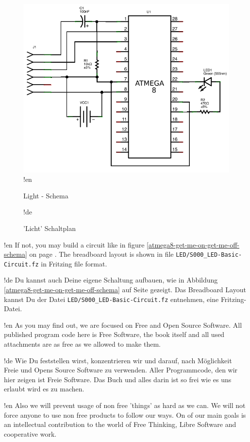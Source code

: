 \documentclass[twoside,12pt,authoryear,openright]{book}
\begin{document}
\begin{figure}[htbp]
  \centering
  \includegraphics[width=120mm]{LED/S000_let-there-be-light_Circuit_schema.png}
!en  \caption{Light - Schema}
!de  \caption{'Licht' Schaltplan}
  \label{atmega8-let-there-be-light-schema}
\end{figure}

!en If not, you may build a circuit like in figure \ref{atmega8-get-me-on-get-me-off-schema} on page \pageref{atmega8-get-me-on-get-me-off-schema}. The breadboard layout is shown in file \texttt{LED/S000\_LED-Basic-Circuit.fz} in Fritzing file format.

!de Du kannst auch Deine eigene Schaltung aufbauen, wie in Abbildung \ref{atmega8-get-me-on-get-me-off-schema} auf Seite \pageref{atmega8-get-me-on-get-me-off-schema} gezeigt. Das Breadboard Layout kannst Du der Datei \texttt{LED/S000\_LED-Basic-Circuit.fz} entnehmen, eine Fritzing-Datei.



!en As you may find out, we are focused on Free and Open Source Software. All published program code here is Free Software, the book itself and all used attachments are as free as we allowed to make them.

!de Wie Du feststellen wirst, konzentrieren wir und darauf, nach Möglichkeit Freie und Opens Source Software zu verwenden. Aller Programmcode, den wir hier zeigen ist Freie Software. Das Buch und alles darin ist so frei wie es uns erlaubt wird es zu machen.



!en Also we will prevent usage of non free 'things' as hard as we can. We will not force anyone to use non free products to follow our ways. On of our main goals is an intellectual contribution to the world of Free Thinking, Libre Software and cooperative work.
\end{document}
